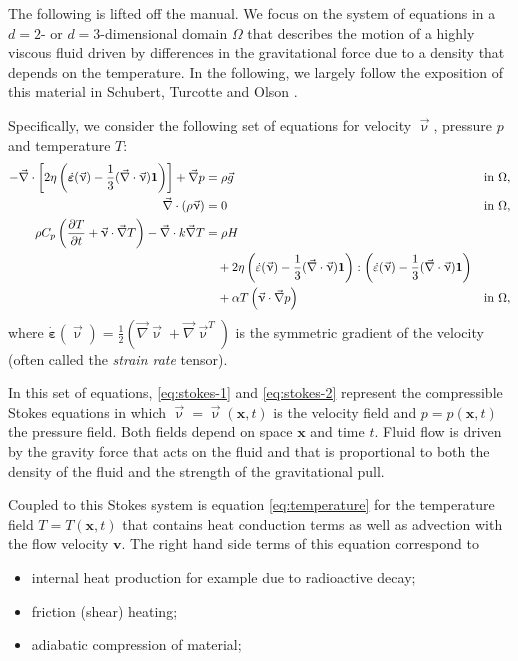 The following is lifted off the \aspect manual.
We focus on the system of equations in a $d=2$- or $d=3$-dimensional
domain $\Omega$ that describes the motion of a highly viscous fluid driven
by differences in the gravitational force due to a density that depends on
the temperature. In the following, we largely follow the exposition of this
material in Schubert, Turcotte and Olson \cite{scto01}.

Specifically, we consider the following set of equations for velocity $\vec\upnu$, pressure $p$ and temperature $T$:
\begin{align}
  \label{eq:stokes-1}
  -\vec\nabla \cdot \left[2\eta \left(\dot{\bm \varepsilon}(\vec \upnu)
                                  - \frac{1}{3}(\vec\nabla \cdot \vec \upnu)\mathbf 1\right)
                \right] + \vec\nabla p &=
  \rho \vec g
  &
  & \textrm{in $\Omega$},
  \\
  \label{eq:stokes-2}
  \vec\nabla \cdot (\rho \vec \upnu) &= 0
  &
  & \textrm{in $\Omega$},
  \\
  \label{eq:temperature}
  \rho C_p \left(\frac{\partial T}{\partial t} + \vec \upnu\cdot\vec\nabla T\right)
  - \vec\nabla\cdot k\vec\nabla T
  &=
  \rho H
  \notag
  \\
  &\quad
  +
  2\eta
  \left(\dot\varepsilon(\vec\upnu) - \frac{1}{3}(\vec\nabla \cdot \vec \upnu)\mathbf 1\right)
  :
  \left(\dot\varepsilon(\vec\upnu) - \frac{1}{3}(\vec\nabla \cdot \vec \upnu)\mathbf 1\right)
  \\
  &\quad
  +\alpha T \left( \vec \upnu \cdot \vec\nabla p \right)
  && \textrm{in $\Omega$},
  \notag
\end{align}
where $\dot{\bm \varepsilon}(\vec\upnu) = \frac{1}{2}(\vec\nabla \vec\upnu + \vec\nabla \vec\upnu^T)$ 
is the symmetric gradient of the velocity (often called the
\textit{strain rate} tensor).

In this set of equations, \eqref{eq:stokes-1} and \eqref{eq:stokes-2}
represent the compressible Stokes equations in which $\vec\upnu =\vec\upnu (\mathbf x,t)$ 
is the velocity field and $p=p(\mathbf x,t)$ the pressure
field. Both fields depend on space $\mathbf x$ and time $t$. Fluid flow is
driven by the gravity force that acts on the fluid and that is proportional to
both the density of the fluid and the strength of the gravitational pull.

Coupled to this Stokes system is equation \eqref{eq:temperature} for the
temperature field $T=T(\mathbf x,t)$ that contains heat conduction terms as
well as advection with the flow velocity $\mathbf v$. The right hand side
terms of this equation correspond to
\begin{itemize}
\item internal heat production for example due to radioactive decay;
\item friction (shear) heating;
\item adiabatic compression of material;
\end{itemize}

